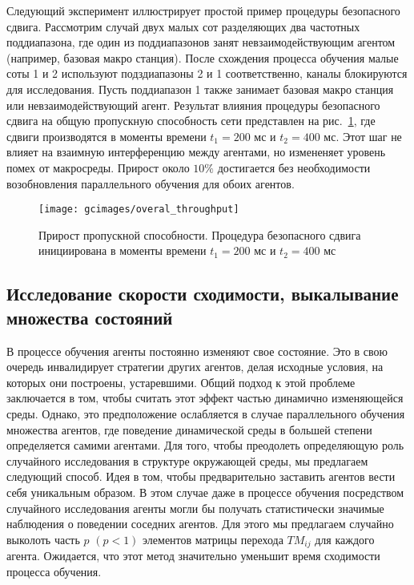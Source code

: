 Следующий эксперимент иллюстрирует простой пример процедуры безопасного сдвига. Рассмотрим случай двух малых сот разделяющих два частотных поддиапазона, где один из поддиапазонов занят невзаимодействующим агентом (например, базовая макро станция). После схождения процесса обучения малые соты 1 и 2 используют подздиапазоны 2 и 1 соответственно, каналы блокируются для исследования. Пусть поддиапазон 1 также занимает базовая макро станция или невзаимодействующий агент. Результат влияния процедуры безопасного сдвига на общую пропускную способность сети представлен на рис.~\ref{fig:safe_shift_overal_throughput}, где сдвиги производятся в моменты времени $t_1=200$ мс и $t_2=400$ мс. Этот шаг не влияет на взаимную интерференцию между агентами, но измененяет уровень помех от макросреды. Прирост около $10\%$ достигается без необходимости возобновления параллельного обучения для обоих агентов.

\begin{figure}
    \centering
    \texttt{[image: gcimages/overal\_throughput]}
    \caption{Прирост пропускной способности. Процедура безопасного сдвига инициирована в моменты времени $t_1=200$ мс и $t_2=400$ мс }
    \label{fig:safe_shift_overal_throughput}
\end{figure}

\subsection{Исследование скорости сходимости, выкалывание множества состояний}
В процессе обучения агенты постоянно изменяют свое состояние. Это в свою очередь инвалидирует стратегии других агентов, делая исходные условия, на которых они построены, устаревшими. Общий подход к этой проблеме заключается в том, чтобы считать этот эффект частью динамично изменяющейся среды. Однако, это предположение ослабляется в случае параллельного обучения множества агентов, где поведение динамической среды в большей степени определяется самими агентами.
Для того, чтобы преодолеть определяющую роль случайного исследования в структуре окружающей среды, мы предлагаем следующий способ. Идея в том, чтобы предварительно заставить агентов вести себя уникальным образом. В этом случае даже в процессе обучения посредством случайного исследования агенты могли бы получать статистически значимые наблюдения о поведении соседних агентов. Для этого мы предлагаем случайно выколоть часть $p$ $(p< 1)$ элементов матрицы перехода $TM_{ij}$ для каждого агента. Ожидается, что этот метод значительно уменьшит время сходимости процесса обучения.



